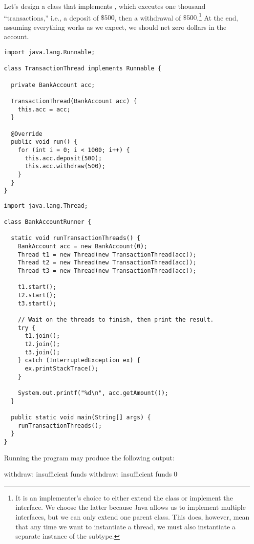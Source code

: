 Let's design a  class that implements , which executes one thousand ``transactions,'' i.e., a deposit of $\$500$, then a withdrawal of $\$500$.\footnote{It is an implementer's choice to either extend the  class or implement the  interface. We choose the latter because Java allows us to implement multiple interfaces, but we can only extend one parent class. This does, however, mean that any time we want to instantiate a thread, we must also instantiate a separate instance of the  subtype.} 
At the end, assuming everything works as we expect, we should net zero dollars in the account.

\enlargethispage{1\baselineskip}
\begin{lstlisting}[language=MyJava]
import java.lang.Runnable;

class TransactionThread implements Runnable {

  private BankAccount acc;

  TransactionThread(BankAccount acc) { 
    this.acc = acc; 
  }

  @Override
  public void run() {
    for (int i = 0; i < 1000; i++) {
      this.acc.deposit(500);
      this.acc.withdraw(500);
    }
  }
}
\end{lstlisting}

\begin{lstlisting}[language=MyJava]
import java.lang.Thread;

class BankAccountRunner {

  static void runTransactionThreads() {
    BankAccount acc = new BankAccount(0);
    Thread t1 = new Thread(new TransactionThread(acc));
    Thread t2 = new Thread(new TransactionThread(acc));
    Thread t3 = new Thread(new TransactionThread(acc));

    t1.start();
    t2.start();
    t3.start();

    // Wait on the threads to finish, then print the result.
    try {
      t1.join();
      t2.join();
      t3.join();
    } catch (InterruptedException ex) { 
      ex.printStackTrace(); 
    }

    System.out.printf("%d\n", acc.getAmount());
  }

  public static void main(String[] args) {
    runTransactionThreads();
  }
}
\end{lstlisting}

Running the program may produce the following output:

\begin{verbnobox}[\small]
withdraw: insufficient funds
withdraw: insufficient funds
0
\end{verbnobox}

